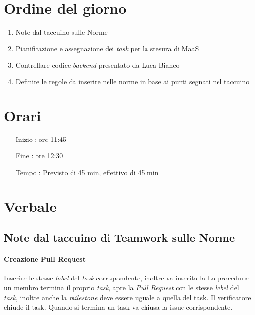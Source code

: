 \documentclass[11pt]{meetingmins}
\begin{document}
\maketitle

\section{Ordine del giorno}

\begin{enumerate}

\item Note dal taccuino sulle Norme
\item Pianificazione e assegnazione dei \textit{task} per la stesura di MaaS
\item Controllare codice \textit{backend} presentato da Luca Bianco
\item Definire le regole da inserire nelle norme in base ai punti segnati nel taccuino


\end{enumerate}

\section{Orari}

\begin{itemize}
\item[Inizio]: ore 11:45
\item[Fine]: ore 12:30
\item[Tempo]: Previsto di 45 min, effettivo di 45 min

\end{itemize}

\section{Verbale}

\subsection{Note dal taccuino di Teamwork sulle Norme}
	\paragraph*{Creazione Pull Request}
		Inserire le stesse \textit{label} del \textit{task} corrispondente, inoltre va inserita la 
		La procedura: un membro termina il proprio \textit{task}, apre la \textit{Pull Request} con le stesse 
		\textit{label} del \textit{task}, inoltre anche la \textit{milestone} deve essere 
		uguale a quella del task. Il verificatore chiude il task.
		Quando si termina un task va chiusa la issue corrispondente.
\end{document}

